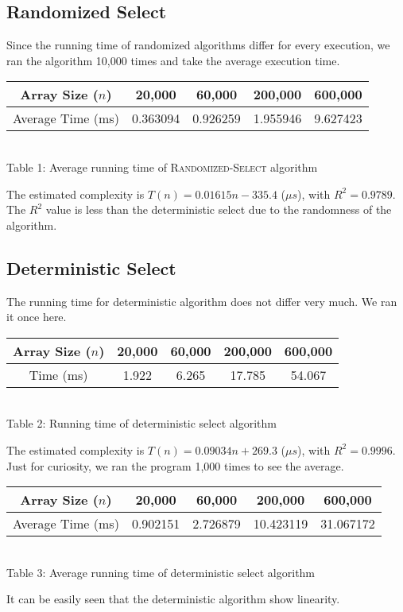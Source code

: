 \documentclass[12pt]{article}
\begin{document}
\subsection{Randomized Select}
Since the running time of randomized algorithms differ for every execution, we ran the algorithm 10,000 times and take the average execution time.\\
\begin{center}
	\begin{tabular}{|c|c|c|c|c|}
		\hline
		Array Size ($n$) & 20,000 & 60,000 & 200,000 & 600,000 \\\hline
		Average Time (ms) & 0.363094 & 0.926259 & 1.955946 & 9.627423 \\\hline
	\end{tabular}\\\vspace{0.5em}
{\small Table 1: Average running time of \textsc{Randomized-Select} algorithm}
\end{center}
The estimated complexity is $T(n) = 0.01615n - 335.4$ ($\mu s$), with $R^2= 0.9789$. The $R^2$ value is less than the deterministic select due to the randomness of the algorithm.
\subsection{Deterministic Select}
The running time for deterministic algorithm does not differ very much. We ran it once here.
\begin{center}
	\begin{tabular}{|c|c|c|c|c|}
		\hline
		Array Size ($n$) & 20,000 & 60,000 & 200,000 & 600,000 \\\hline
		Time (ms) & 1.922 & 6.265 & 17.785 & 54.067 \\ \hline
	\end{tabular}\\\vspace{0.5em}
{\small Table 2: Running time of deterministic select algorithm}
\end{center}
The estimated complexity is $T(n) = 0.09034n + 269.3$ ($\mu s$), with $R^2 = 0.9996$.\\
Just for curiosity, we ran the program 1,000 times to see the average.

\begin{center}
	\begin{tabular}{|c|c|c|c|c|}
		\hline
		Array Size ($n$) & 20,000 & 60,000 & 200,000 & 600,000 \\\hline
		Average Time (ms) & 0.902151 & 2.726879 & 10.423119 & 31.067172 \\ \hline
	\end{tabular}\\\vspace{0.5em}
{\small Table 3: Average running time of deterministic select algorithm}
\end{center}
It can be easily seen that the deterministic algorithm show linearity. 
\end{document}

